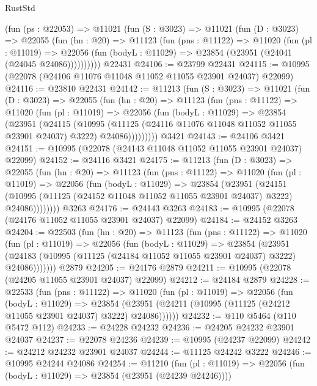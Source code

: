 \begin{lexlean}{RustStd}
\begin{coremodule}
    (fun (ps : @22053) =>
    @11021
      (fun (S : @3023) =>
      @11021
        (fun (D : @3023) =>
        @22055
          (fun (hn : @20) =>
          @11123
            (fun (pns : @11122) =>
            @11020
              (fun (pl : @11019) =>
              @22056 (fun (bodyL : @11029) => @23854 (@23951 (@24041 (@24045 @24086))))))))))
    @22431
@24106 := @23799 @22431
@24115 := @10995 (@22078 (@24106 @11076 @11048 @11052 @11055 @23901 @24037) @22099)
@24116 := @23810 @22431
@24142 := @11213
    (fun (S : @3023) =>
    @11021
      (fun (D : @3023) =>
      @22055
        (fun (hn : @20) =>
        @11123
          (fun (pns : @11122) =>
          @11020
            (fun (pl : @11019) =>
            @22056
              (fun (bodyL : @11029) =>
              @23854
                (@23951
                  (@24115
                    (@10995
                      (@11125 (@24116 @11076 @11048 @11052 @11055 @23901 @24037) @3222)
                      @24086)))))))))
    @3421
@24143 := @24106 @3421
@24151 := @10995 (@22078 (@24143 @11048 @11052 @11055 @23901 @24037) @22099)
@24152 := @24116 @3421
@24175 := @11213
    (fun (D : @3023) =>
    @22055
      (fun (hn : @20) =>
      @11123
        (fun (pns : @11122) =>
        @11020
          (fun (pl : @11019) =>
          @22056
            (fun (bodyL : @11029) =>
            @23854
              (@23951
                (@24151
                  (@10995 (@11125 (@24152 @11048 @11052 @11055 @23901 @24037) @3222) @24086))))))))
    @3263
@24176 := @24143 @3263
@24183 := @10995 (@22078 (@24176 @11052 @11055 @23901 @24037) @22099)
@24184 := @24152 @3263
@24204 := @22503
    (fun (hn : @20) =>
    @11123
      (fun (pns : @11122) =>
      @11020
        (fun (pl : @11019) =>
        @22056
          (fun (bodyL : @11029) =>
          @23854
            (@23951
              (@24183 (@10995 (@11125 (@24184 @11052 @11055 @23901 @24037) @3222) @24086)))))))
    @2879
@24205 := @24176 @2879
@24211 := @10995 (@22078 (@24205 @11055 @23901 @24037) @22099)
@24212 := @24184 @2879
@24228 := @22533
    (fun (pns : @11122) =>
    @11020
      (fun (pl : @11019) =>
      @22056
        (fun (bodyL : @11029) =>
        @23854 (@23951 (@24211 (@10995 (@11125 (@24212 @11055 @23901 @24037) @3222) @24086))))))
@24232 := @110 @5464 (@110 @5472 @112)
@24233 := @24228 @24232
@24236 := @24205 @24232 @23901 @24037
@24237 := @22078 @24236
@24239 := @10995 (@24237 @22099)
@24242 := @24212 @24232 @23901 @24037
@24244 := @11125 @24242 @3222
@24246 := @10995 @24244 @24086
@24254 := @11210
    (fun (pl : @11019) => @22056 (fun (bodyL : @11029) => @23854 (@23951 (@24239 @24246))))

\end{coremodule}
\end{lexlean}
